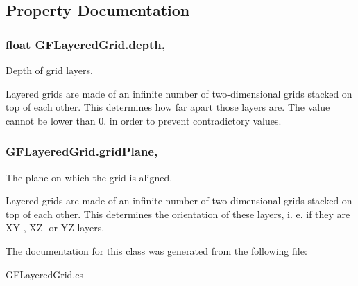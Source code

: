 \subsection{Property Documentation}
\hypertarget{class_g_f_layered_grid_a3ff168354ca75d04aae2340c48c7070c_a3ff168354ca75d04aae2340c48c7070c}{
\subsubsection[{depth}]{\setlength{\rightskip}{0pt plus 5cm}float G\+F\+Layered\+Grid.\+depth\hspace{0.3cm}{\ttfamily [get]}, {\ttfamily [set]}}}\label{class_g_f_layered_grid_a3ff168354ca75d04aae2340c48c7070c_a3ff168354ca75d04aae2340c48c7070c}
Depth of grid layers.

Layered grids are made of an infinite number of two-\/dimensional grids stacked on top of each other. This determines how far apart those layers are. The value cannot be lower than 0. in order to prevent contradictory values. \hypertarget{class_g_f_layered_grid_aeda8ad1af2b0d4ed12481de40ddb3f55_aeda8ad1af2b0d4ed12481de40ddb3f55}{
\subsubsection[{grid\+Plane}]{ G\+F\+Layered\+Grid.\+grid\+Plane\hspace{0.3cm}{\ttfamily [get]}, {\ttfamily [set]}}}\label{class_g_f_layered_grid_aeda8ad1af2b0d4ed12481de40ddb3f55_aeda8ad1af2b0d4ed12481de40ddb3f55}
The plane on which the grid is aligned.

Layered grids are made of an infinite number of two-\/dimensional grids stacked on top of each other. This determines the orientation of these layers, i. e. if they are X\+Y-\/, X\+Z-\/ or Y\+Z-\/layers. 

The documentation for this class was generated from the following file\+:\begin{DoxyCompactItemize}
\item 
G\+F\+Layered\+Grid.\+cs\end{DoxyCompactItemize}
